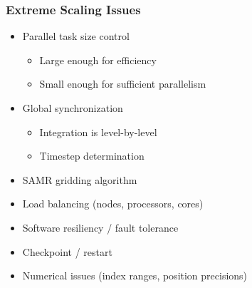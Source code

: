 \begin{frame}[fragile] \frametitle{Extreme Scaling Issues}
   \begin{itemize}
      \item {}Parallel task size control
      \begin{itemize}
          \item {}Large enough for efficiency
          \item {}Small enough for sufficient parallelism
      \end{itemize}
      \item {}Global synchronization
      \begin{itemize}
          \item {}Integration is level-by-level
          \item {}Timestep determination
      \end{itemize}
      \item {}SAMR gridding algorithm
      \item {}Load balancing (nodes, processors, cores)
      \item {}Software resiliency / fault tolerance
      \item {}Checkpoint / restart
      \item {}Numerical issues (index ranges, position precisions)
   \end{itemize}
\end{frame}
%
